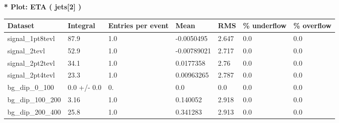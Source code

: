 \documentclass[a4paper, 10pt]{article}
\begin{document}
\textbf{* Plot: ETA ( jets[2] ) }\\
   \begin{table}[H]
  \begin{center}
    \begin{tabular}{|m{23.0mm}|m{23.0mm}|m{18.0mm}|m{19.0mm}|m{19.0mm}|m{19.0mm}|m{19.0mm}|}
      \hline
      {\cellcolor{yellow}         Dataset}& {\cellcolor{yellow}         Integral}& {\cellcolor{yellow}         Entries per event}& {\cellcolor{yellow}         Mean}& {\cellcolor{yellow}         RMS}& {\cellcolor{yellow}         \% underflow}& {\cellcolor{yellow}         \% overflow}\\
      \hline
      {\cellcolor{white}         signal\_1pt8tevl}& {\cellcolor{white}         87.9}& {\cellcolor{white}         1.0}& {\cellcolor{white}         -0.0050495}& {\cellcolor{white}         2.647}& {\cellcolor{green}         0.0}& {\cellcolor{green}         0.0}\\
      \hline
      {\cellcolor{white}         signal\_2tevl}& {\cellcolor{white}         52.9}& {\cellcolor{white}         1.0}& {\cellcolor{white}         -0.00789021}& {\cellcolor{white}         2.717}& {\cellcolor{green}         0.0}& {\cellcolor{green}         0.0}\\
      \hline
      {\cellcolor{white}         signal\_2pt2tevl}& {\cellcolor{white}         34.1}& {\cellcolor{white}         1.0}& {\cellcolor{white}         0.0177358}& {\cellcolor{white}         2.76}& {\cellcolor{green}         0.0}& {\cellcolor{green}         0.0}\\
      \hline
      {\cellcolor{white}         signal\_2pt4tevl}& {\cellcolor{white}         23.3}& {\cellcolor{white}         1.0}& {\cellcolor{white}         0.00963265}& {\cellcolor{white}         2.787}& {\cellcolor{green}         0.0}& {\cellcolor{green}         0.0}\\
      \hline
      {\cellcolor{white}         bg\_dip\_0\_100}& {\cellcolor{white}         0.0 +/\-- 0.0}& {\cellcolor{white}         0.}& {\cellcolor{white}         0.0}& {\cellcolor{white}         0.0}& {\cellcolor{green}         0.0}& {\cellcolor{green}         0.0}\\
      \hline
      {\cellcolor{white}         bg\_dip\_100\_200}& {\cellcolor{white}         3.16}& {\cellcolor{white}         1.0}& {\cellcolor{white}         0.140052}& {\cellcolor{white}         2.918}& {\cellcolor{green}         0.0}& {\cellcolor{green}         0.0}\\
      \hline
      {\cellcolor{white}         bg\_dip\_200\_400}& {\cellcolor{white}         25.8}& {\cellcolor{white}         1.0}& {\cellcolor{white}         0.341283}& {\cellcolor{white}         2.913}& {\cellcolor{green}         0.0}& {\cellcolor{green}         0.0}\\

\end{tabular}
\end{center}
\end{table}
\end{document}
